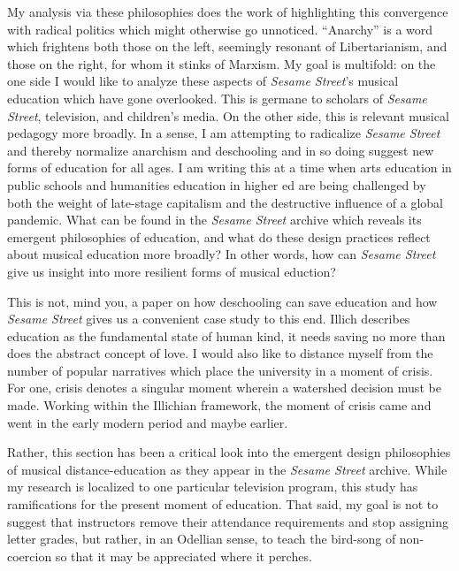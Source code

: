 \documentclass[12pt,letterpaper]{article}
\newcommand{\ses}{\textit{Sesame Street }}
\begin{document}
	My analysis via these philosophies does the work of highlighting this 
	convergence with radical politics which might otherwise go unnoticed. 
	``Anarchy'' is a word which frightens both those on the left, seemingly
	 resonant of Libertarianism, and those on the right, for whom it stinks 
	of Marxism. My goal is multifold: on the one side I would like to 
	analyze these aspects of \textit{Sesame Street}’s musical education 
	which have gone overlooked. This is germane to scholars of 
	\textit{Sesame Street}, television, and children’s media. On the other 
	side, this is relevant musical pedagogy more broadly. In a sense,
 	I am attempting to radicalize \ses and thereby normalize anarchism and 
	deschooling and in so doing suggest new forms of education for all ages. 
	I am writing this at a time when arts education in public schools and 
	humanities education in higher ed are being challenged by both the 
	weight of late-stage capitalism and the destructive influence of a 
	global pandemic. What can be found in the \ses archive which 
	reveals its emergent philosophies of education, and what do these 
	design 	practices reflect about musical education more broadly? 
	In other words, how can \ses give us insight into more resilient forms
	of musical eduction?

	This is not, mind you, a paper on how deschooling can save education and
 	how \ses gives us a convenient case study to this end. Illich 
	describes education as the fundamental state of human kind, it needs
	saving no more than does the abstract concept of love. I would also 
	like to distance myself from the number of popular narratives which 
	place the university in a moment of crisis. For one, crisis denotes 
	a singular moment wherein a watershed decision must be made. Working 
	within the Illichian framework, the moment of crisis came and went in 
	the early modern period and maybe earlier.

	Rather, this section has been a critical look into the emergent design 
	philosophies of musical distance-education as they appear in the \ses 
	archive. While my research is localized to one particular television 
	program, this study has ramifications for the present moment of 
	education. That said, my goal is not to suggest that instructors remove 
	their attendance requirements and stop assigning letter grades, but 
	rather, in an Odellian sense, to teach the bird-song of non-coercion 
	so that it may be appreciated where it perches.
\end{document}
